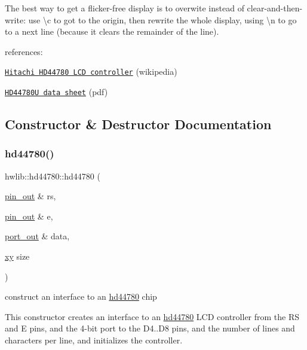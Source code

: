 The best way to get a flicker-\/free display is to overwite instead of clear-\/and-\/then-\/write\+: use \textquotesingle{}\textbackslash{}c\textquotesingle{} to got to the \textquotesingle{}origin\textquotesingle{}, then rewrite the whole display, using \textquotesingle{}\textbackslash{}n\textquotesingle{} to go to a next line (because it clears the remainder of the line).

references\+:
\begin{DoxyItemize}
\item \href{https://en.wikipedia.org/wiki/Hitachi_HD44780_LCD_controller}{\tt Hitachi H\+D44780 L\+CD controller} (wikipedia)
\item \href{https://www.sparkfun.com/datasheets/LCD/HD44780.pdf}{\tt H\+D44780U data sheet} (pdf) 
\end{DoxyItemize}

\subsection{Constructor \& Destructor Documentation}
\mbox{\label{classhwlib_1_1hd44780_a55c758dc1d78037ada5b6c3937d1b090}} 
\subsubsection{\texorpdfstring{hd44780()}{hd44780()}}
{\footnotesize\ttfamily hwlib\+::hd44780\+::hd44780 (\begin{DoxyParamCaption}\item[{\hyperlink{classhwlib_1_1pin__out}{pin\+\_\+out} \&}]{rs,  }\item[{\hyperlink{classhwlib_1_1pin__out}{pin\+\_\+out} \&}]{e,  }\item[{\hyperlink{classhwlib_1_1port__out}{port\+\_\+out} \&}]{data,  }\item[{\hyperlink{classhwlib_1_1xy}{xy}}]{size }\end{DoxyParamCaption})\hspace{0.3cm}{\ttfamily [inline]}}

construct an interface to an \hyperlink{classhwlib_1_1hd44780}{hd44780} chip

This constructor creates an interface to an \hyperlink{classhwlib_1_1hd44780}{hd44780} L\+CD controller from the RS and E pins, and the 4-\/bit port to the D4..D8 pins, and the number of lines and characters per line, and initializes the controller. 

